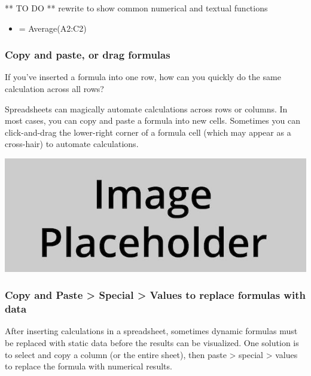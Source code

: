 \documentclass[
  english,
]{book}
\providecommand{\tightlist}{%
  \setlength{\itemsep}{0pt}\setlength{\parskip}{0pt}}
\begin{document}
** TO DO ** rewrite to show common numerical and textual functions

\begin{itemize}
\tightlist
\item
  = Average(A2:C2)
\end{itemize}

\hypertarget{copy-and-paste-or-drag-formulas}{%
\subsubsection*{Copy and paste, or drag formulas}\label{copy-and-paste-or-drag-formulas}}

If you've inserted a formula into one row, how can you quickly do the same calculation across all rows?

Spreadsheets can magically automate calculations across rows or columns. In most cases, you can copy and paste a formula into new cells. Sometimes you can click-and-drag the lower-right corner of a formula cell (which may appear as a cross-hair) to automate calculations.

\includegraphics{images/placeholder.jpg}

\hypertarget{copy-and-paste-special-values-to-replace-formulas-with-data}{%
\subsubsection*{Copy and Paste \textgreater{} Special \textgreater{} Values to replace formulas with data}\label{copy-and-paste-special-values-to-replace-formulas-with-data}}

After inserting calculations in a spreadsheet, sometimes dynamic formulas must be replaced with static data before the results can be visualized. One solution is to select and copy a column (or the entire sheet), then paste \textgreater{} special \textgreater{} values to replace the formula with numerical results.
\end{document}
